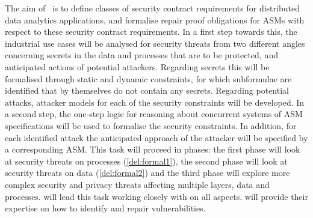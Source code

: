 \begin{Workpackage}{\thewpno}
\begin{Task}
\TaskResults{%
\ref{del:formal1},
\ref{del:formal2},
\ref{del:formal3}
}
\TaskHeader{}

The aim of \theTask\ is to define classes of security contract requirements for distributed data analytics applications, and formalise repair proof obligations for ASMs with respect to these security contract requirements. In a first step towards this, the industrial use cases will be analysed for security threats from two different angles concerning secrets in the data and processes that are to be protected, and anticipated actions of potential attackers. Regarding secrets this will be formalised through static and dynamic constraints, for which subformulae are identified that by themselves do not contain any secrets. Regarding potential attacks, attacker models for each of the security constraints will be developed. In a second step, the one-step logic for reasoning about concurrent systems of ASM specifications will be used to formalise the security constraints. In addition, for each identified attack the anticipated approach of the attacker will be specified by a corresponding ASM. This task will proceed in phases: the first phase will look at security threats on processes (\ref{del:formal1}),
the second phase will look at security threats on data (\ref{del:formal2}) and the third phase will explore
more complex security and privacy threats affecting multiple layers, data and processes.
\SCCHshort will lead this task working closely with  \SA on all aspects. \IBMshort will provide their expertise on how to identify and repair vulnerabilities.
\end{Task}


%
%




\end{Workpackage}
